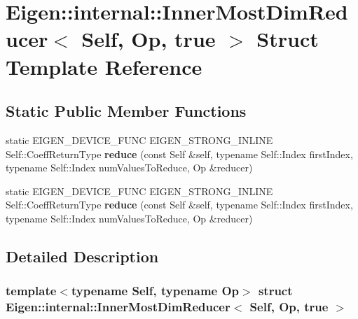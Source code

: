 \hypertarget{struct_eigen_1_1internal_1_1_inner_most_dim_reducer_3_01_self_00_01_op_00_01true_01_4}{}\section{Eigen\+:\+:internal\+:\+:Inner\+Most\+Dim\+Reducer$<$ Self, Op, true $>$ Struct Template Reference}
\label{struct_eigen_1_1internal_1_1_inner_most_dim_reducer_3_01_self_00_01_op_00_01true_01_4}
\subsection*{Static Public Member Functions}
\begin{DoxyCompactItemize}
\item 
\mbox{\label{struct_eigen_1_1internal_1_1_inner_most_dim_reducer_3_01_self_00_01_op_00_01true_01_4_acfec95075c8d3e1501051989708d3b0e}} 
static E\+I\+G\+E\+N\+\_\+\+D\+E\+V\+I\+C\+E\+\_\+\+F\+U\+NC E\+I\+G\+E\+N\+\_\+\+S\+T\+R\+O\+N\+G\+\_\+\+I\+N\+L\+I\+NE Self\+::\+Coeff\+Return\+Type {\bfseries reduce} (const Self \&self, typename Self\+::\+Index first\+Index, typename Self\+::\+Index num\+Values\+To\+Reduce, Op \&reducer)
\item 
\mbox{\label{struct_eigen_1_1internal_1_1_inner_most_dim_reducer_3_01_self_00_01_op_00_01true_01_4_acfec95075c8d3e1501051989708d3b0e}} 
static E\+I\+G\+E\+N\+\_\+\+D\+E\+V\+I\+C\+E\+\_\+\+F\+U\+NC E\+I\+G\+E\+N\+\_\+\+S\+T\+R\+O\+N\+G\+\_\+\+I\+N\+L\+I\+NE Self\+::\+Coeff\+Return\+Type {\bfseries reduce} (const Self \&self, typename Self\+::\+Index first\+Index, typename Self\+::\+Index num\+Values\+To\+Reduce, Op \&reducer)
\end{DoxyCompactItemize}


\subsection{Detailed Description}
\subsubsection*{template$<$typename Self, typename Op$>$\newline
struct Eigen\+::internal\+::\+Inner\+Most\+Dim\+Reducer$<$ Self, Op, true $>$}



